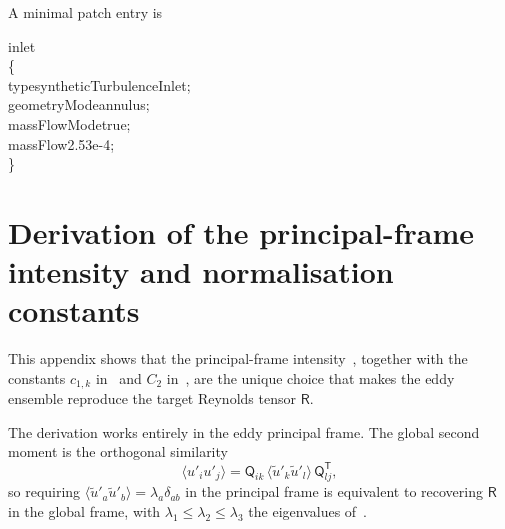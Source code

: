 \documentclass[
 amsmath,amssymb,
 aps,
 twocolumn,
]{revtex4-2}
\newcommand{\bR}{\mathsf{R}}
\newcommand{\bQ}{\mathsf{Q}}
\begin{document}
A minimal patch entry is 

\noindent\begin{minipage}{\columnwidth}
\ttfamily\small
inlet\\
\{\\
\hspace*{2em}type\hspace{1.6em}syntheticTurbulenceInlet;\\
\hspace*{2em}geometryMode\hspace{0.3em}annulus;\\
\hspace*{2em}massFlowMode\hspace{0.3em}true;\\
\hspace*{2em}massFlow\hspace{1.0em}2.53e-4;\\
\}
\end{minipage}

\appendix
\section{Derivation of the principal-frame intensity and normalisation constants}\label{app:derivation}

This appendix shows that the principal-frame
intensity~, together with the constants $c_{1,k}$
in~ and $C_2$ in~, are the unique choice that
makes the eddy ensemble reproduce the target Reynolds tensor $\bR$.

The derivation works entirely in the eddy principal frame. The global
second moment is the orthogonal similarity
\begin{equation}\label{eq:app_rotation}
  \langle u'_i u'_j\rangle
   = \bQ_{ik}\,\langle\tilde u'_k\tilde u'_l\rangle\,\bQ^{\mathsf T}_{lj},
\end{equation}
so requiring
$\langle\tilde u'_a\tilde u'_b\rangle=\lambda_a\delta_{ab}$ in the
principal frame is equivalent to recovering $\bR$ in the global frame,
with $\lambda_1\le\lambda_2\le\lambda_3$ the eigenvalues
of~.
\end{document}
